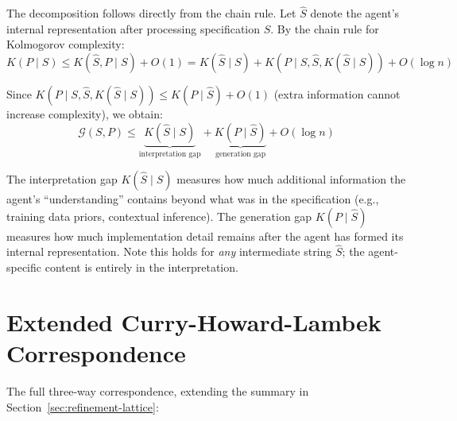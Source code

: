 \documentclass[11pt, a4paper, copyright]{googledeepmind}
\begin{document}
The decomposition follows directly from the chain rule. Let $\hat{S}$ denote the agent's internal representation after processing specification $S$. By the chain rule for Kolmogorov complexity:
\begin{equation}
    K(P \mid S) \leq K(\hat{S}, P \mid S) + O(1) = K(\hat{S} \mid S) + K(P \mid S, \hat{S}, K(\hat{S} \mid S)) + O(\log n)
\end{equation}

Since $K(P \mid S, \hat{S}, K(\hat{S} \mid S)) \leq K(P \mid \hat{S}) + O(1)$ (extra information cannot increase complexity), we obtain:
\begin{equation}
    \mathcal{G}(S, P) \leq \underbrace{K(\hat{S} \mid S)}_{\text{interpretation gap}} + \underbrace{K(P \mid \hat{S})}_{\text{generation gap}} + O(\log n)
\end{equation}

The interpretation gap $K(\hat{S} \mid S)$ measures how much additional information the agent's ``understanding'' contains beyond what was in the specification (e.g., training data priors, contextual inference). The generation gap $K(P \mid \hat{S})$ measures how much implementation detail remains after the agent has formed its internal representation. Note this holds for \emph{any} intermediate string $\hat{S}$; the agent-specific content is entirely in the interpretation.


\section{Extended Curry-Howard-Lambek Correspondence}
\label{app:chl}

The full three-way correspondence, extending the summary in Section~\ref{sec:refinement-lattice}:
\end{document}
